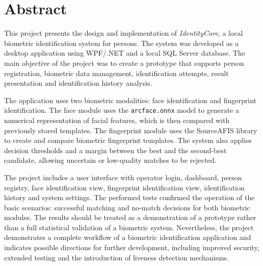 \chapter*{Abstract}
\label{cha:abstract-en}

This project presents the design and implementation of \textit{IdentityCore}, a local biometric identification system for persons. The system was developed as a desktop application using WPF/.NET and a local SQL Server database. The main objective of the project was to create a prototype that supports person registration, biometric data management, identification attempts, result presentation and identification history analysis.

\bigskip

The application uses two biometric modalities: face identification and fingerprint identification. The face module uses the \texttt{arcface.onnx} model to generate a numerical representation of facial features, which is then compared with previously stored templates. The fingerprint module uses the SourceAFIS library to create and compare biometric fingerprint templates. The system also applies decision thresholds and a margin between the best and the second-best candidate, allowing uncertain or low-quality matches to be rejected.

\bigskip

The project includes a user interface with operator login, dashboard, person registry, face identification view, fingerprint identification view, identification history and system settings. The performed tests confirmed the operation of the basic scenarios: successful matching and no-match decisions for both biometric modules. The results should be treated as a demonstration of a prototype rather than a full statistical validation of a biometric system. Nevertheless, the project demonstrates a complete workflow of a biometric identification application and indicates possible directions for further development, including improved security, extended testing and the introduction of liveness detection mechanisms.